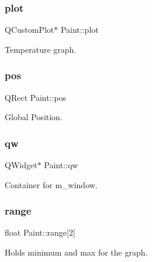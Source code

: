 \subsubsection{\texorpdfstring{plot}{plot}}
{\footnotesize\ttfamily Q\+Custom\+Plot$\ast$ Paint\+::plot\hspace{0.3cm}{\ttfamily [private]}}



Temperature graph. 

\mbox{\label{classPaint_ad18245bd858cc8c6bd715e56659e3634}} 
\subsubsection{\texorpdfstring{pos}{pos}}
{\footnotesize\ttfamily Q\+Rect Paint\+::pos\hspace{0.3cm}{\ttfamily [private]}}



Global Position. 

\mbox{\label{classPaint_abaab9ddb4a329f78b558793a5f3a84c3}} 
\subsubsection{\texorpdfstring{qw}{qw}}
{\footnotesize\ttfamily Q\+Widget$\ast$ Paint\+::qw\hspace{0.3cm}{\ttfamily [private]}}



Container for m\+\_\+window. 

\mbox{\label{classPaint_a7c7236ff4eb95bce87e4700dbc3385eb}} 
\subsubsection{\texorpdfstring{range}{range}}
{\footnotesize\ttfamily float Paint\+::range\mbox{[}2\mbox{]}\hspace{0.3cm}{\ttfamily [private]}}



Holds minimum and max for the graph. 

\mbox{\label{classPaint_a0cd2955c474cb99795506bdee2df71ab}} 
